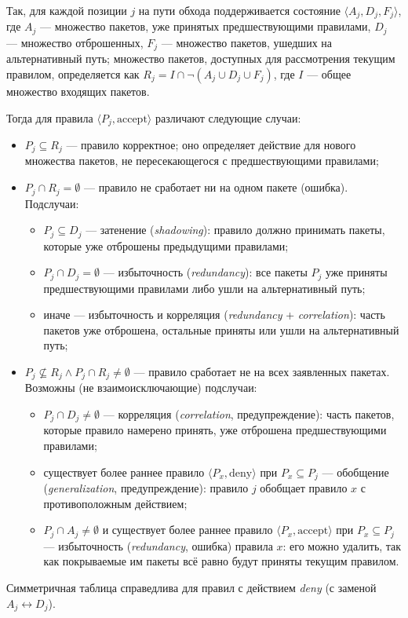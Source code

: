 Так, для каждой позиции $j$ на пути обхода поддерживается состояние $\langle A_j, D_j, F_j\rangle$, где $A_j$ --- множество пакетов, уже принятых предшествующими правилами, $D_j$ --- множество отброшенных, $F_j$ --- множество пакетов, ушедших на альтернативный путь; множество пакетов, доступных для рассмотрения текущим правилом, определяется как $R_j = I \cap \neg(A_j \cup D_j \cup F_j)$, где $I$ --- общее множество входящих пакетов.

Тогда для правила $\langle P_j, \text{accept}\rangle$ различают следующие случаи:
\begin{itemize}
    \item $P_j \subseteq R_j$ --- правило корректное; оно определяет действие для нового множества пакетов, не пересекающегося с предшествующими правилами;
    \item $P_j \cap R_j = \emptyset$ --- правило не сработает ни на одном пакете (ошибка). Подслучаи:
    \begin{itemize}
        \item $P_j \subseteq D_j$ --- затенение (\emph{shadowing}): правило должно принимать пакеты, которые уже отброшены предыдущими правилами;
        \item $P_j \cap D_j = \emptyset$ --- избыточность (\emph{redundancy}): все пакеты $P_j$ уже приняты предшествующими правилами либо ушли на альтернативный путь;
        \item иначе --- избыточность и корреляция (\emph{redundancy} + \emph{correlation}): часть пакетов уже отброшена, остальные приняты или ушли на альтернативный путь;
    \end{itemize}
    \item $P_j \not\subseteq R_j \wedge P_j \cap R_j \neq \emptyset$ --- правило сработает не на всех заявленных пакетах. Возможны (не взаимоисключающие) подслучаи:
    \begin{itemize}
        \item $P_j \cap D_j \neq \emptyset$ --- корреляция (\emph{correlation},\allowbreak{} предупреждение): часть пакетов, которые правило намерено принять, уже отброшена предшествующими правилами;
        \item существует более раннее правило $\langle P_x, \text{deny}\rangle$ при $P_x \subseteq P_j$ --- обобщение (\emph{generalization},\allowbreak{} предупреждение): правило $j$ обобщает правило $x$ с противоположным действием;
        \item $P_j \cap A_j \mathrel{\neq} \emptyset$ и существует более раннее правило $\langle P_x, \text{accept}\rangle$ при $P_x \subseteq P_j$ --- избыточность (\emph{redundancy},\allowbreak{} ошибка) правила $x$: его можно удалить, так как покрываемые им пакеты всё равно будут приняты текущим правилом.
    \end{itemize}
\end{itemize}
Симметричная таблица справедлива для правил с действием \emph{deny} (с заменой $A_j \leftrightarrow D_j$).

